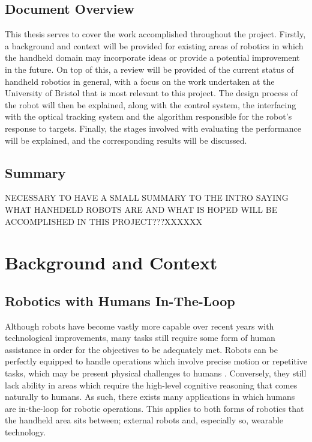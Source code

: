 \documentclass[11pt]{article}
\begin{document}
\subsection{Document Overview}
This thesis serves to cover the work accomplished throughout the project. Firstly, a background and context will be provided for existing areas of robotics in which the handheld domain may incorporate ideas or provide a potential improvement in the future. On top of this, a review will be provided of the current status of handheld robotics in general, with a focus on the work undertaken at the University of Bristol that is most relevant to this project. The design process of the robot will then be explained, along with the control system, the interfacing with the optical tracking system and the algorithm responsible for the robot's response to targets. Finally, the stages involved with evaluating the performance will be explained, and the corresponding results will be discussed.

\subsection{Summary}
NECESSARY TO HAVE A SMALL SUMMARY TO THE INTRO SAYING WHAT HANHDELD ROBOTS ARE AND WHAT IS HOPED WILL BE ACCOMPLISHED IN THIS PROJECT???XXXXXX
\pagebreak

\section{Background and Context}
\subsection{Robotics with Humans In-The-Loop} \label{intheloop}

Although robots have become vastly more capable over recent years with technological improvements, many tasks still require some form of human assistance in order for the objectives to be adequately met. Robots can be perfectly equipped to handle operations which involve precise motion or repetitive tasks, which may be present physical challenges to humans \cite{Chipalkatty2012}. Conversely, they still lack ability in areas which require the high-level cognitive reasoning that comes naturally to humans. As such, there exists many applications in which humans are in-the-loop for robotic operations. This applies to both forms of robotics that the handheld area sits between; external robots and, especially so, wearable technology.  
\end{document}
